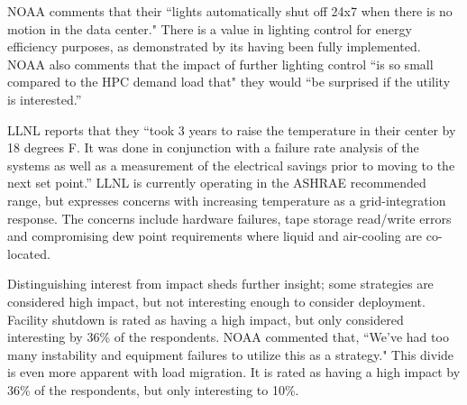 NOAA comments that their ``lights automatically shut off 24x7 
when there is no motion in the data center." There is a value in lighting control for 
energy efficiency purposes, as demonstrated by its having been fully implemented. NOAA also comments that
the impact of further lighting control ``is so small compared to the HPC demand load that" they would ``be surprised 
if the utility is interested.''

LLNL reports that they ``took 3 years to raise the temperature in their center by 18 degrees F. It was done in conjunction with a failure rate analysis of the systems as well as a measurement of the electrical savings prior to moving to the next set point.'' LLNL is currently operating in the ASHRAE 
recommended range, but expresses concerns with increasing temperature as a grid-integration response. The 
concerns include hardware failures, 
tape storage read/write errors and compromising dew point requirements where liquid and air-cooling are co-located.

Distinguishing interest from impact sheds further insight; some strategies are 
considered high impact, but not interesting enough to consider deployment. Facility
shutdown is rated as having a high impact, but only
considered interesting by 36\% of the respondents. NOAA commented that, ``We've had too many instability and equipment failures to utilize this as a strategy." This divide is even more
apparent with load migration. It is rated as having a high impact by 36\% of the
respondents, but only interesting to 10\%. 